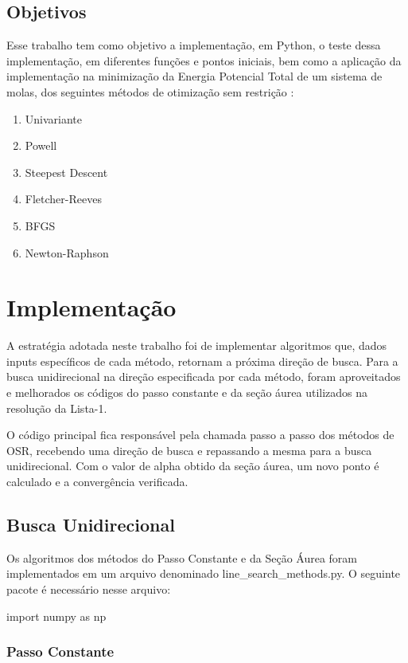 \documentclass[10pt, a4paper]{article}
\begin{document}
\subsection{Objetivos}

Esse trabalho tem como objetivo a implementação, em Python, o teste dessa implementação, em diferentes funções 
e pontos iniciais, bem como a aplicação da implementação na minimização da Energia Potencial Total de um sistema de molas,
dos seguintes métodos de otimização sem restrição :
\renewcommand{\theenumi}{\alph{enumi}}
\begin{enumerate}
  \item Univariante
  \item Powell
  \item Steepest Descent
  \item Fletcher-Reeves
  \item BFGS
  \item Newton-Raphson
\end{enumerate}

\section{Implementação}

A estratégia adotada neste trabalho foi de implementar algoritmos que, dados inputs específicos de cada método, retornam a próxima direção de busca. Para a busca unidirecional na direção especificada por cada método, 
foram aproveitados e melhorados os códigos do passo constante e da seção áurea utilizados na resolução da Lista-1. 

O código principal fica responsável pela chamada passo a passo dos métodos de OSR, recebendo uma direção
de busca e repassando a mesma para a busca unidirecional. Com o valor de alpha obtido da seção áurea, um novo ponto é calculado e a convergência verificada.

\subsection{Busca Unidirecional}

Os algoritmos dos métodos do Passo Constante e da Seção Áurea foram implementados em um arquivo denominado line\_search\_methods.py.
O seguinte pacote é necessário nesse arquivo: 
\begin{python}
  import numpy as np
\end{python}

\subsubsection{Passo Constante}
\end{document}
